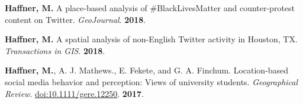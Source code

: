 




\begin{cventries}
   \cventry
      {}
      {}
      {}
      {}
      {
        \begin{cvitems}
          \vspace{-4mm}
        \item
          {\textbf{Haffner, M.}
            A place-based analysis of \#BlackLivesMatter and counter-protest
            content on Twitter. \textit{GeoJournal}. \textbf{2018}.} \\
          \vspace{-2mm}
        \end{cvitems}
    }

   \cventry
      {}
      {}
      {}
      {}
      {
        \begin{cvitems}
          \vspace{-4mm}
        \item {\textbf{Haffner, M.} A spatial analysis of non-English Twitter
            activity in Houston, TX. \textit{Transactions in GIS}.}
            \textbf{2018}. \\
          \vspace{-2mm}
        \end{cvitems}
    }

   \cventry
      {}
      {}
      {}
      {}
      {
        \begin{cvitems}
          \vspace{-4mm} \item {\textbf{Haffner, M.}, A. J. Mathews., E. Fekete, and
            G. A. Finchum. Location-based social media behavior and perception:
            Views of university students. \textit{Geographical Review}.
            \href{http://onlinelibrary.wiley.com/doi/10.1111/gere.12250/abstract}{doi:10.1111/gere.12250}.}
          \textbf{2017}.
          \\
          \vspace{-2mm}
        \end{cvitems}
    } %


\end{cventries}
